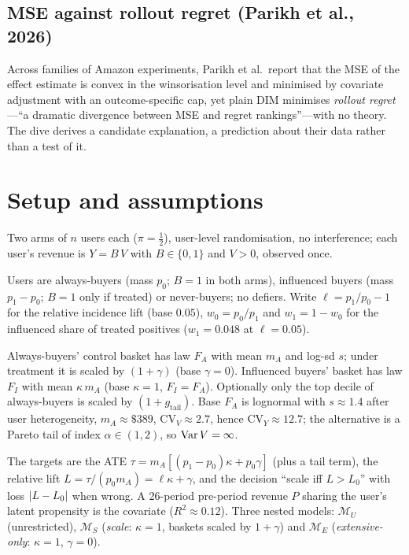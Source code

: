 \subsection{MSE against rollout regret (Parikh et al., 2026)}

Across families of Amazon experiments, Parikh et al.\ report that the MSE of the effect estimate is convex in the winsorisation level and minimised by covariate adjustment with an outcome-specific cap, yet plain DIM minimises \emph{rollout regret}---``a dramatic divergence between MSE and regret rankings''---with no theory. The dive derives a candidate explanation, a prediction about their data rather than a test of it.

\section{Setup and assumptions}

Two arms of $n$ users each ($\pi = \tfrac12$), user-level randomisation, no interference; each user's revenue is $Y = B\,V$ with $B \in \{0, 1\}$ and $V > 0$, observed once.

\begin{assumption}
\label{ht:ass:strata}
Users are always-buyers (mass $p_0$; $B = 1$ in both arms), influenced buyers (mass $p_1 - p_0$; $B = 1$ only if treated) or never-buyers; no defiers. Write $\ell = p_1/p_0 - 1$ for the relative incidence lift (base $0.05$), $w_0 = p_0/p_1$ and $w_1 = 1 - w_0$ for the influenced share of treated positives ($w_1 = 0.048$ at $\ell = 0.05$).
\end{assumption}

\begin{assumption}
\label{ht:ass:baskets}
Always-buyers' control basket has law $F_A$ with mean $m_A$ and log-sd $s$; under treatment it is scaled by $(1 + \gamma)$ (base $\gamma = 0$). Influenced buyers' basket has law $F_I$ with mean $\kappa\,m_A$ (base $\kappa = 1$, $F_I = F_A$). Optionally only the top decile of always-buyers is scaled by $(1 + g_{\mathrm{tail}})$. Base $F_A$ is lognormal with $s \approx 1.4$ after user heterogeneity, $m_A \approx \$389$, $\mathrm{CV}_V \approx 2.7$, hence $\mathrm{CV}_Y \approx 12.7$; the alternative is a Pareto tail of index $\alpha \in (1, 2)$, so $\operatorname{Var} V = \infty$.
\end{assumption}

The targets are the ATE $\tau = m_A[(p_1 - p_0)\kappa + p_0\gamma]$ (plus a tail term), the relative lift $L = \tau/(p_0 m_A) = \ell\kappa + \gamma$, and the decision ``scale iff $L > L_0$'' with loss $\left|L - L_0\right|$ when wrong. A 26-period pre-period revenue $P$ sharing the user's latent propensity is the covariate ($R^2 \approx 0.12$). Three nested models: $\mathcal M_U$ (unrestricted), $\mathcal M_S$ (\emph{scale}: $\kappa = 1$, baskets scaled by $1 + \gamma$) and $\mathcal M_E$ (\emph{extensive-only}: $\kappa = 1$, $\gamma = 0$).

